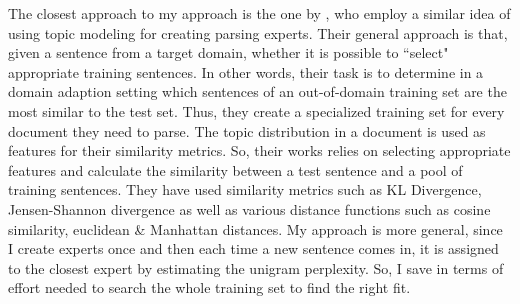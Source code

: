 The closest approach to my approach is the one by \cite{plank2011effective}, who employ a similar idea of using topic modeling for creating parsing experts. Their general approach is that, given a sentence from a target domain, whether it is possible to ``select" appropriate training sentences. In other words, their task is to determine in a domain adaption setting which sentences of an out-of-domain training set are the most similar to the test set. Thus, they create a specialized training set for every document they need to parse. The topic distribution in a document is used as features for their similarity metrics. So, their works relies on selecting appropriate features and calculate the similarity between a test sentence and a pool of training sentences. They have used similarity metrics such as KL Divergence, Jensen-Shannon divergence as well as various distance functions such as cosine similarity, euclidean \& Manhattan distances. My approach is more general, since I create experts once and then each time a new sentence comes in, it is assigned to the closest expert by estimating the unigram perplexity. So, I save in terms of effort needed to search the whole training set to find the right fit.

